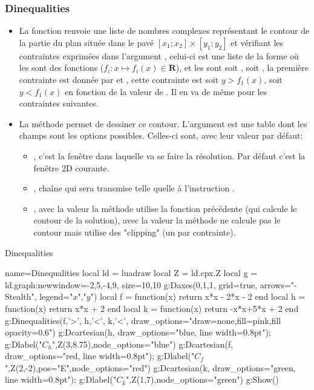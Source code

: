\subsubsection{Dinequalities}

\begin{itemize}
    \item La fonction  renvoie une liste de nombres complexes représentant le contour de la partie du plan située dans le pavé $[x_1;x_2]\times[y_1;y_2]$ et vérifiant les contraintes exprimées dans l'argument , celui-ci est une liste de la forme  où les  sont des fonctions ($f_i\colon x \mapsto f_i(x)\in \mathbf R$), et les  sont soit , soit , la première contrainte est donnée par  et , cette contrainte est soit $y>f_1(x)$, soit $y<f_1(x)$ en fonction de la valeur de . Il en va de même pour les contraintes suivantes.
 
    \item La méthode  permet de dessiner ce contour. L'argument  est une table dont les champs sont les options possibles. Celles-ci sont, avec leur valeur par défaut:
  \begin{itemize}
      \item {}, c'est la fenêtre dans laquelle va se faire la résolution. Par défaut c'est la fenêtre 2D courante.
      \item {}, chaîne qui sera transmise telle quelle à l'instruction \drawcmd.
      \item {}, avec la valeur \false la méthode utilise la fonction précédente (qui calcule le contour de la solution), avec la valeur \true la méthode ne calcule pas le contour mais utilise des "clipping" (un par contrainte).
  \end{itemize}
\end{itemize}

\begin{demo}{Dinequalities}
\begin{luadraw}{name=Dinequalities}
local ld = luadraw
local Z = ld.cpx.Z
local g = ld.graph:new{window={-2,5,-4,9}, size={10,10}}
g:Daxes({0,1,1}, {grid=true, arrows="-Stealth", legend={"$x$","$y$"}})
local f = function(x) return x*x - 2*x - 2 end
local h = function(x) return x*x + 2 end
local k = function(x) return -x*x+5*x + 2 end
g:Dinequalities({f,'>', h,'<', k,'<'}, {draw_options="draw=none,fill=pink,fill opacity=0.6"})
g:Dcartesian(h, {draw_options="blue, line width=0.8pt"}); g:Dlabel("$C_h$",Z(3,8.75),{node_options="blue"})
g:Dcartesian(f, {draw_options="red, line width=0.8pt"}); g:Dlabel("$C_f$",Z(2,-2),{pos="E",node_options="red"})
g:Dcartesian(k, {draw_options="green, line width=0.8pt"}); g:Dlabel("$C_k$",Z(1,7),{node_options="green"})
g:Show()
\end{luadraw}
\end{demo}

